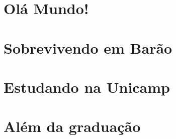 \documentclass[a4paper,10pt,oldfontcommands]{memoir}
\begin{document}
\setlength{\parskip}{0em}
\mainmatter
\pagestyle{headings}
\twocolumn
\chapter{Olá Mundo!}


\clearpage


\clearpage


\clearpage



\chapter{Sobrevivendo em Barão}

\newpage

\newpage

\newpage

\newpage


\chapter{Estudando na Unicamp}

\newpage

\newpage

\newpage

\newpage

\newpage

\newpage

\newpage


\chapter{Além da graduação}

\newpage

\newpage

\newpage

\newpage

\newpage

\newpage

\end{document}
